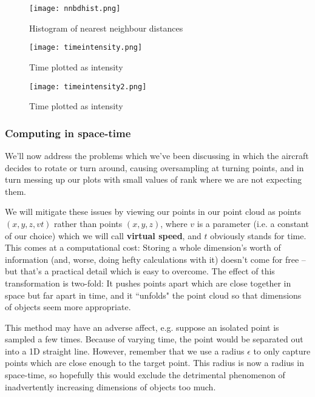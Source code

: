 \documentclass[a4paper,11pt,twoside]{article}
\theoremstyle{definition}
\theoremstyle{remark}
\begin{document}
\begin{figure}[!h]
  \caption{Histogram of nearest neighbour distances}
  \centering
    \texttt{[image: nnbdhist.png]}
    \label{nnbdhist}
\end{figure}
\newpage
\begin{figure}[!h]
  \caption{Time plotted as intensity}
  \centering
    \texttt{[image: timeintensity.png]}
    \label{timeint}
\end{figure}

\begin{figure}[!h]
  \caption{Time plotted as intensity}
  \centering
    \texttt{[image: timeintensity2.png]}
    \label{timeint2}
\end{figure}
\newpage
\subsubsection{Computing in space-time}\label{timeplot}
We'll now address the problems which we've been discussing in which the aircraft decides to rotate or turn around, causing oversampling at turning points, and in turn messing up our plots with small values of rank where we are not expecting them.

We will mitigate these issues by viewing our points in our point cloud as points $(x,y,z,vt)$ rather than points $(x,y,z)$, where $v$ is a parameter (i.e. a constant of our choice) which we will call \textbf{virtual speed}, and $t$ obviously stands for time. This comes at a computational cost: Storing a whole dimension's worth of information (and, worse, doing hefty calculations with it) doesn't come for free -- but that's a practical detail which is easy to overcome. The effect of this transformation is two-fold: It pushes points apart which are close together in space but far apart in time, and it ``unfolds" the point cloud so that dimensions of objects seem more appropriate.

This method may have an adverse affect, e.g. suppose an isolated point is sampled a few times. Because of varying time, the point would be separated out into a 1D straight line. However, remember that we use a radius $\epsilon$ to only capture points which are close enough to the target point. This radius is now a radius in space-time, so hopefully this would exclude the detrimental phenomenon of inadvertently increasing dimensions of objects too much.
\end{document}
